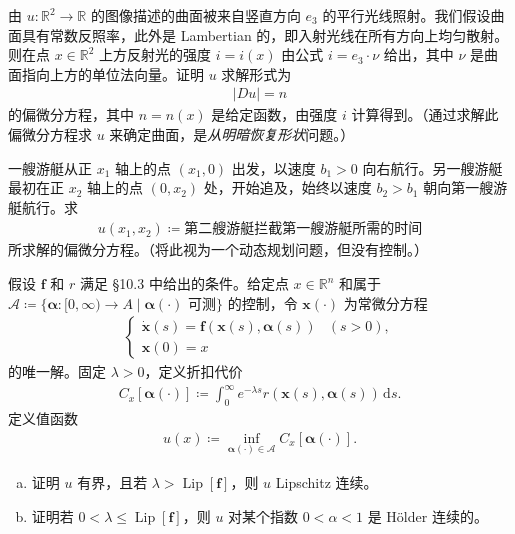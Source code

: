 \documentclass[../../main.tex]{subfiles}
\begin{document}
\begin{exercise}\label{exercise:ch10-从明暗恢复形状}
由 $u:\mathbb{R}^2\to\mathbb{R}$ 的图像描述的曲面被来自竖直方向 $e_3$ 的平行光线照射。我们假设曲面具有常数反照率，此外是 Lambertian 的，即入射光线在所有方向上均匀散射。则在点 $x\in\mathbb{R}^2$ 上方反射光的强度 $i=i(x)$ 由公式 $i=e_3\cdot\nu$ 给出，其中 $\nu$ 是曲面指向上方的单位法向量。证明 $u$ 求解形式为
\begin{align*}
|Du|=n
\end{align*}
的偏微分方程，其中 $n=n(x)$ 是给定函数，由强度 $i$ 计算得到。（通过求解此偏微分方程求 $u$ 来确定曲面，是\emph{从明暗恢复形状}问题。）
\end{exercise}

\begin{exercise}\label{exercise:ch10-追及问题}
一艘游艇从正 $x_1$ 轴上的点 $(x_1,0)$ 出发，以速度 $b_1>0$ 向右航行。另一艘游艇最初在正 $x_2$ 轴上的点 $(0,x_2)$ 处，开始追及，始终以速度 $b_2>b_1$ 朝向第一艘游艇航行。求
\begin{align*}
u(x_1,x_2)\coloneqq \text{第二艘游艇拦截第一艘游艇所需的时间}
\end{align*}
所求解的偏微分方程。（将此视为一个动态规划问题，但没有控制。）
\end{exercise}

\begin{exercise}[无限时域控制问题。]\label{exercise:ch10-无限时域控制}假设 $\mathbf{f}$ 和 $r$ 满足 \S10.3 中给出的条件。给定点 $x\in\mathbb{R}^n$ 和属于 $\mathcal{A}\coloneqq\{\boldsymbol{\alpha}:[0,\infty)\to A\mid\boldsymbol{\alpha}(\cdot)\text{ 可测}\}$ 的控制，令 $\mathbf{x}(\cdot)$ 为常微分方程
\begin{align*}
\begin{cases}
\dot{\mathbf{x}}(s)=\mathbf{f}(\mathbf{x}(s),\boldsymbol{\alpha}(s)) & (s>0),\\
\mathbf{x}(0)=x
\end{cases}
\end{align*}
的唯一解。固定 $\lambda>0$，定义折扣代价
\begin{align*}
C_x[\boldsymbol{\alpha}(\cdot)]\coloneqq\int_0^\infty e^{-\lambda s}r(\mathbf{x}(s),\boldsymbol{\alpha}(s))\,\mathrm{d}s.
\end{align*}
定义值函数
\begin{align*}
u(x)\coloneqq\inf_{\boldsymbol{\alpha}(\cdot)\in\mathcal{A}}C_x[\boldsymbol{\alpha}(\cdot)].
\end{align*}
\begin{enumerate}[(a)]
\item 证明 $u$ 有界，且若 $\lambda>\operatorname{Lip}[\mathbf{f}]$，则 $u$ Lipschitz 连续。
\item 证明若 $0<\lambda\leqslant\operatorname{Lip}[\mathbf{f}]$，则 $u$ 对某个指数 $0<\alpha<1$ 是 H\"older 连续的。
\end{enumerate}
\end{exercise}
\end{document}
